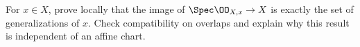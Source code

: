 \begin{problem}\label{chal:vi21-c05}
For $x\in X$, prove locally that the image of $\Spec\OO_{X,x}\to X$ is exactly the set of generalizations of $x$.  Check compatibility on overlaps and explain why this result is independent of an affine chart.
\end{problem}
